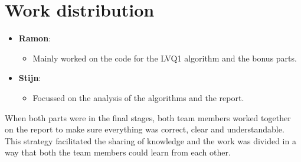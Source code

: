 \documentclass[twoside, a4paper, fleqn, reqno]{article}
\begin{document}
\section*{Work distribution}
	\begin{itemize}
		\item \textbf{Ramon}:
		\begin{itemize}
			\item Mainly worked on the code for the LVQ1 algorithm and the bonus parts.
		\end{itemize}
		\item \textbf{Stijn}:
		\begin{itemize}
			\item Focussed on the analysis of the algorithms and the report.
		\end{itemize}
	\end{itemize}
	When both parts were in the final stages, both team members worked together on the report to make sure everything was correct, clear and understandable.
	This strategy facilitated the sharing of knowledge and the work was divided in a way that both the team members could learn from each other.
\end{document}
